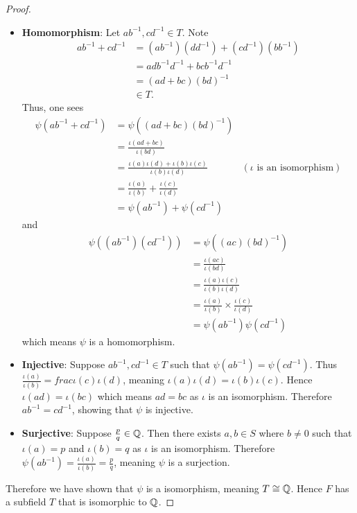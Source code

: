 \begin{proof}
\begin{itemize}
        \item \textbf{Homomorphism}: Let $ab^{-1}, cd^{-1} \in T$. Note
        \begin{align*}
            ab^{-1} + cd^{-1} &= (ab^{-1})(dd^{-1}) + (cd^{-1})(bb^{-1})\\
            &= adb^{-1}d^{-1} + bcb^{-1}d^{-1}\\
            &= (ad + bc)(bd)^{-1}\\
            &\in T.
        \end{align*}
        Thus, one sees
        \begin{align*}
            \psi(ab^{-1} + cd^{-1}) &= \psi((ad+bc)(bd)^{-1})\\
            &= \frac{\iota(ad+bc)}{\iota(bd)}\\
            &= \frac{\iota(a)\iota(d) + \iota(b)\iota(c)}{\iota(b)\iota(d)} & (\iota \text{ is an isomorphism})\\
            &= \frac{\iota(a)}{\iota(b)} + \frac{\iota(c)}{\iota(d)}\\
            &= \psi(ab^{-1}) + \psi(cd^{-1})
        \end{align*}
        and
        \begin{align*}
            \psi((ab^{-1})(cd^{-1})) &= \psi((ac)(bd)^{-1})\\
            &= \frac{\iota(ac)}{\iota(bd)}\\
            &= \frac{\iota(a)\iota(c)}{\iota(b)\iota(d)}\\
            &= \frac{\iota(a)}{\iota(b)} \times \frac{\iota(c)}{\iota(d)}\\
            &= \psi(ab^{-1})\psi(cd^{-1})
        \end{align*}
        which means $\psi$ is a homomorphism.
        
        \item \textbf{Injective}: Suppose $ab^{-1}, cd^{-1} \in T$ such that $\psi(ab^{-1}) = \psi(cd^{-1})$. Thus $\frac{\iota(a)}{\iota(b)} = frac{\iota(c)}{\iota(d)}$, meaning $\iota(a)\iota(d) = \iota(b)\iota(c)$. Hence $\iota(ad) = \iota(bc)$ which means $ad = bc$ as $\iota$ is an isomorphism. Therefore $ab^{-1} = cd^{-1}$, showing that $\psi$ is injective.
        
        \item \textbf{Surjective}: Suppose $\frac pq \in \mathbb{Q}$. Then there exists $a, b \in S$ where $b \neq 0$ such that $\iota(a) = p$ and $\iota(b) = q$ as $\iota$ is an isomorphism. Therefore $\psi(ab^{-1}) = \frac{\iota(a)}{\iota(b)} = \frac pq$, meaning $\psi$ is a surjection.
    \end{itemize}
    Therefore we have shown that $\psi$ is a isomorphism, meaning $T \cong \mathbb{Q}$. Hence $F$ has a subfield $T$ that is isomorphic to $\mathbb{Q}$.
\end{proof}

